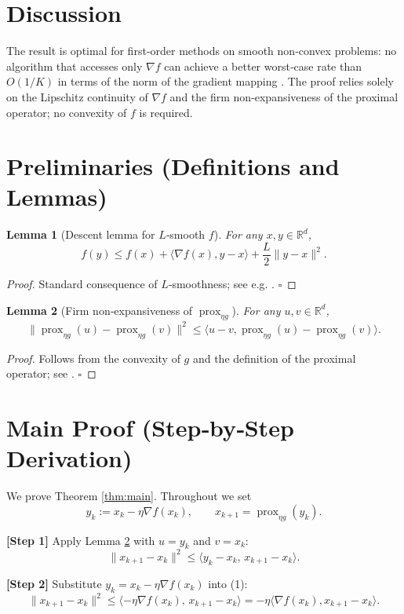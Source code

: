 \documentclass[11pt]{article}
\newtheorem{lemma}{Lemma}
\begin{document}
\section*{Discussion}
The result is optimal for first‑order methods on smooth non‑convex problems: no algorithm that accesses only $\nabla f$ can achieve a better worst‑case rate than $O(1/K)$ in terms of the norm of the gradient mapping \cite{cgc2015}. The proof relies solely on the Lipschitz continuity of $\nabla f$ and the firm non‑expansiveness of the proximal operator; no convexity of $f$ is required.

\newpage
\section*{Preliminaries (Definitions and Lemmas)}
\begin{lemma}[Descent lemma for $L$‑smooth $f$]\label{lem:descent}
For any $x,y\in\mathbb{R}^{d}$,
\[
f(y)\le f(x)+\langle\nabla f(x),y-x\rangle+\frac{L}{2}\|y-x\|^{2}.
\]
\end{lemma}
\begin{proof}
Standard consequence of $L$‑smoothness; see e.g. \cite{nesterov2004introductory}. \hfill $\square$
\end{proof}

\begin{lemma}[Firm non‑expansiveness of $\operatorname{prox}_{\eta g}$]\label{lem:firm}
For any $u,v\in\mathbb{R}^{d}$,
\[
\|\operatorname{prox}_{\eta g}(u)-\operatorname{prox}_{\eta g}(v)\|^{2}
\le\langle u-v,\operatorname{prox}_{\eta g}(u)-\operatorname{prox}_{\eta g}(v)\rangle .
\]
\end{lemma}
\begin{proof}
Follows from the convexity of $g$ and the definition of the proximal operator; see \cite{parikh2014proximal}. \hfill $\square$
\end{proof}

\section*{Main Proof (Step‑by‑Step Derivation)}
We prove Theorem \ref{thm:main}.  Throughout we set
\[
y_{k}:=x_{k}-\eta\nabla f(x_{k}),\qquad
x_{k+1}= \operatorname{prox}_{\eta g}(y_{k}).
\]

\noindent\textbf{[Step 1]} Apply Lemma \ref{lem:firm} with $u=y_{k}$ and $v=x_{k}$:
\[
\|x_{k+1}-x_{k}\|^{2}\le\langle y_{k}-x_{k},\,x_{k+1}-x_{k}\rangle.
\tag{1}
\]

\noindent\textbf{[Step 2]} Substitute $y_{k}=x_{k}-\eta\nabla f(x_{k})$ into (1):
\[
\|x_{k+1}-x_{k}\|^{2}\le\langle -\eta\nabla f(x_{k}),\,x_{k+1}-x_{k}\rangle
=-\eta\langle \nabla f(x_{k}),x_{k+1}-x_{k}\rangle.
\tag{2}
\]
\end{document}
